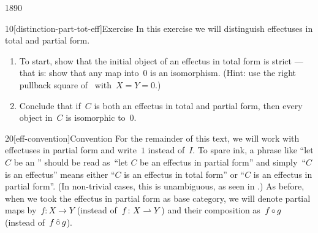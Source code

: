 \begin{parsec}{1890}%
\begin{point}{10}[distinction-part-tot-eff]{Exercise}%
In this exercise we will
    distinguish effectuses in total and partial form.
\begin{enumerate}
\item
To start, show that the initial object of an effectus in total form is strict
    --- that is: show that any map into~$0$ is an isomorphism.
    (Hint: use the right pullback square of~
        with~$X=Y=0$.)
\item
Conclude that if~$C$ is both an effectus in total and partial form,
then every object in~$C$ is isomorphic to~$0$.
\end{enumerate}
\spacingfix{}
\end{point}
\begin{point}{20}[eff-convention]{Convention}%
For the remainder of this text, we will work with effectuses in partial form
    and write~$1$ instead of~$I$.
To spare ink, a phrase like ``let $C$ be an ''
should be read as~``let $C$ be an effectus in partial form''
and simply~``$C$ is an effectus'' means either ``$C$ is an effectus in total form''
    or ``$C$ is an effectus in partial form''.
(In non-trivial cases, this
    is unambiguous, as seen in .)
As before, when we took the effectus in partial form as base category,
    we will denote partial maps by~$f\colon X \to Y$
    (instead of~$f\colon X \rightharpoonup Y$)
        and their composition as~$f \mathop{\circ} g$
        (instead of~$f \mathop{\hat\circ} g$).
\end{point}
\end{parsec}


